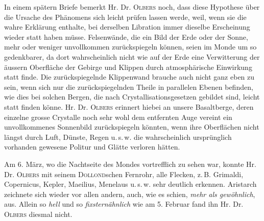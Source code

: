 In einem spätern Briefe bemerkt Hr. Dr. \textsc{Olbers} noch, dass diese Hypothese über die Ursache
des Phänomens sich leicht prüfen lassen werde, weil, wenn sie die wahre Erklärung enthalte, bei derselben Libration immer dieselbe Erscheinung wieder statt haben müsse. Felsenwände, die ein Bild der
Erde oder der Sonne, mehr oder weniger unvollkommen zurückspiegeln können, seien im Monde um
so gedenkbarer, da dort wahrscheinlich nicht wie auf der Erde eine Verwitterung der äussern Oberfläche der Gebirge und Klippen durch atmosphärische Einwirkung statt finde. Die zurückspiegelnde
Klippenwand brauche auch nicht ganz eben zu sein, wenn sich nur die zurückspiegelnden Theile in parallelen Ebenen befinden, wie dies bei solchen Bergen, die nach Crystallisationsgesetzen gebildet sind,
leicht statt finden könne. Hr. Dr. \textsc{Olbers} erinnert hiebei an unsere Basaltberge, deren einzelne grosse
Crystalle noch sehr wohl dem entfernten Auge vereint ein unvollkommenes Sonnenbild zurückspiegeln
könnten, wenn ihre Oberflächen nicht längst durch Luft, Dünste, Regen u.\,s.\,w. die wahrscheinlich ursprünglich vorhanden gewesene Politur und Glätte verloren hätten.

Am 6. März, wo die Nachtseite des Mondes vortrefflich zu sehen war, konnte Hr. Dr. \textsc{Olbers}
mit seinem \textsc{Dollond}schen Fernrohr, alle Flecken, z.\,B. Grimaldi, Copernicus, Kepler, Maeilius, Menelaus u.\,s.\,w. sehr deutlich erkennen. Aristarch zeichnete sich wieder vor allen andern, auch, wie es
schien, \emph{mehr als gewöhnlich}, aus. Allein so \emph{hell} und so \emph{fixsternähnlich} wie am 5. Februar fand ihn Hr.
Dr. \textsc{Olbers} diesmal nicht.
